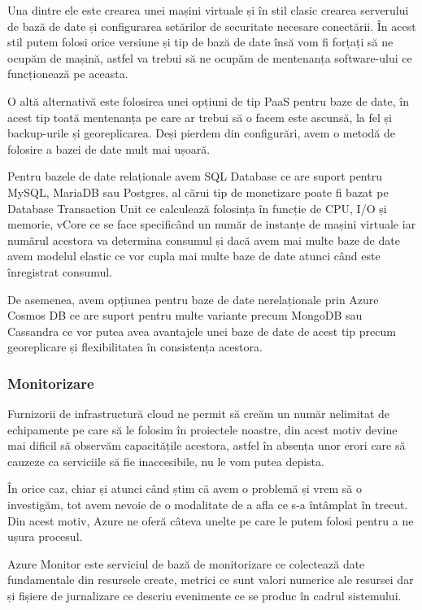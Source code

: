 Una dintre ele este crearea unei mașini virtuale și în stil clasic crearea serverului
de bază de date și configurarea setărilor de securitate necesare conectării. În acest 
stil putem folosi orice versiune și tip de bază de date însă vom fi forțați să 
ne ocupăm de mașină, astfel va trebui să ne ocupăm de mentenanța software-ului ce
funcționează pe aceasta.

O altă alternativă este folosirea unei opțiuni de tip PaaS pentru baze de date, în 
acest tip toată mentenanța pe care ar trebui să o facem este ascunsă, la fel și 
backup-urile și georeplicarea. Deși pierdem din configurări, avem o metodă de 
folosire a bazei de date mult mai ușoară.

Pentru bazele de date relaționale avem SQL Database ce are suport pentru MySQL, MariaDB
sau Postgres, al cărui tip de monetizare poate fi bazat pe Database Transaction Unit
ce calculează folosința în funcție de CPU, I/O și memorie, vCore ce se face specificând 
un număr de instanțe de mașini virtuale iar numărul acestora va determina consumul și dacă
avem mai multe baze de date avem modelul elastic ce vor cupla mai multe baze de date atunci 
când este înregistrat consumul.

De asemenea, avem opțiunea pentru baze de date nerelaționale prin Azure Cosmos DB
ce are suport pentru multe variante precum MongoDB sau Cassandra ce vor putea avea 
avantajele unei baze de date de acest tip precum georeplicare și flexibilitatea în consistența acestora.

\subsubsection{Monitorizare}

Furnizorii de infrastructură cloud ne permit să creăm un număr nelimitat de echipamente
pe care să le folosim în proiectele noastre, din acest motiv devine mai dificil să
observăm capacitățile acestora, astfel în absența unor erori care să cauzeze ca 
serviciile să fie inaccesibile, nu le vom putea depista.

În orice caz, chiar și atunci când știm că avem o problemă și vrem să o investigăm,
tot avem nevoie de o modalitate de a afla ce s-a întâmplat în trecut. Din acest motiv,
Azure ne oferă câteva unelte pe care le putem folosi pentru a ne ușura procesul.

Azure Monitor este serviciul de bază de monitorizare ce colectează date fundamentale
din resursele create, metrici ce sunt valori numerice ale resursei dar și fișiere de 
jurnalizare ce descriu evenimente ce se produc în cadrul sistemului.

